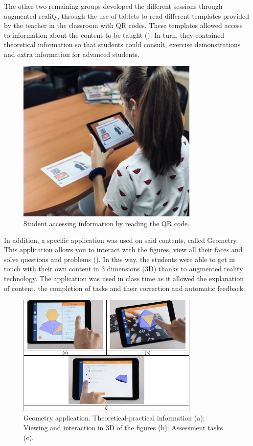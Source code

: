 \documentclass{textolivre}
\begin{document}
The other two remaining groups developed the different sessions through augmented reality, through the use of tablets to read different templates provided by the teacher in the classroom with QR codes. These templates allowed access to information about the content to be taught (). In turn, they contained theoretical information so that students could consult, exercise demonstrations and extra information for advanced students.

\begin{figure}[htbp]
 \centering
 \includegraphics[width=0.8\textwidth]{fig-002.jpg}
 \caption{Student accessing information by reading the QR code.}
 \label{fig2}
\end{figure}

In addition, a specific application was used on said contents, called Geometry. This application allows you to interact with the figures, view all their faces and solve questions and problems (). In this way, the students were able to get in touch with their own content in 3 dimensions (3D) thanks to augmented reality technology. The application was used in class time as it allowed the explanation of content, the completion of tasks and their correction and automatic feedback.

\begin{figure}[htbp]
 \centering
 \includegraphics[width=0.8\textwidth]{fig3.png}
 \caption{Geometry application. Theoretical-practical information (a); Viewing and interaction in 3D of the figures (b); Assessment tasks (c).}
 \label{fig3}
\end{figure}
\end{document}
